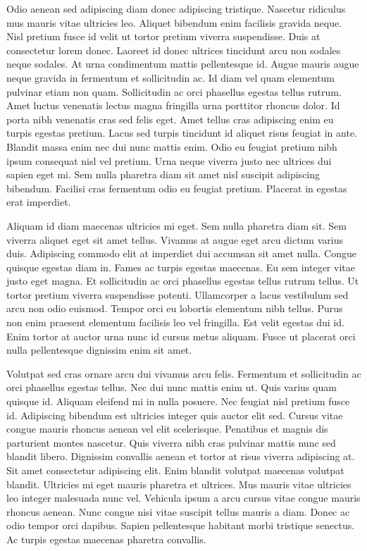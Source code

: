 \documentclass[11pt,a4paper]{article}
\begin{document}
Odio aenean sed adipiscing diam donec adipiscing tristique. Nascetur ridiculus mus mauris vitae ultricies leo. Aliquet bibendum enim facilisis gravida neque. Nisl pretium fusce id velit ut tortor pretium viverra suspendisse. Duis at consectetur lorem donec. Laoreet id donec ultrices tincidunt arcu non sodales neque sodales. At urna condimentum mattis pellentesque id. Augue mauris augue neque gravida in fermentum et sollicitudin ac. Id diam vel quam elementum pulvinar etiam non quam. Sollicitudin ac orci phasellus egestas tellus rutrum. Amet luctus venenatis lectus magna fringilla urna porttitor rhoncus dolor. Id porta nibh venenatis cras sed felis eget. Amet tellus cras adipiscing enim eu turpis egestas pretium. Lacus sed turpis tincidunt id aliquet risus feugiat in ante. Blandit massa enim nec dui nunc mattis enim. Odio eu feugiat pretium nibh ipsum consequat nisl vel pretium. Urna neque viverra justo nec ultrices dui sapien eget mi. Sem nulla pharetra diam sit amet nisl suscipit adipiscing bibendum. Facilisi cras fermentum odio eu feugiat pretium. Placerat in egestas erat imperdiet.

Aliquam id diam maecenas ultricies mi eget. Sem nulla pharetra diam sit. Sem viverra aliquet eget sit amet tellus. Vivamus at augue eget arcu dictum varius duis. Adipiscing commodo elit at imperdiet dui accumsan sit amet nulla. Congue quisque egestas diam in. Fames ac turpis egestas maecenas. Eu sem integer vitae justo eget magna. Et sollicitudin ac orci phasellus egestas tellus rutrum tellus. Ut tortor pretium viverra suspendisse potenti. Ullamcorper a lacus vestibulum sed arcu non odio euismod. Tempor orci eu lobortis elementum nibh tellus. Purus non enim praesent elementum facilisis leo vel fringilla. Est velit egestas dui id. Enim tortor at auctor urna nunc id cursus metus aliquam. Fusce ut placerat orci nulla pellentesque dignissim enim sit amet.

Volutpat sed cras ornare arcu dui vivamus arcu felis. Fermentum et sollicitudin ac orci phasellus egestas tellus. Nec dui nunc mattis enim ut. Quis varius quam quisque id. Aliquam eleifend mi in nulla posuere. Nec feugiat nisl pretium fusce id. Adipiscing bibendum est ultricies integer quis auctor elit sed. Cursus vitae congue mauris rhoncus aenean vel elit scelerisque. Penatibus et magnis dis parturient montes nascetur. Quis viverra nibh cras pulvinar mattis nunc sed blandit libero. Dignissim convallis aenean et tortor at risus viverra adipiscing at. Sit amet consectetur adipiscing elit. Enim blandit volutpat maecenas volutpat blandit. Ultricies mi eget mauris pharetra et ultrices. Mus mauris vitae ultricies leo integer malesuada nunc vel. Vehicula ipsum a arcu cursus vitae congue mauris rhoncus aenean. Nunc congue nisi vitae suscipit tellus mauris a diam. Donec ac odio tempor orci dapibus. Sapien pellentesque habitant morbi tristique senectus. Ac turpis egestas maecenas pharetra convallis.
\end{document}
